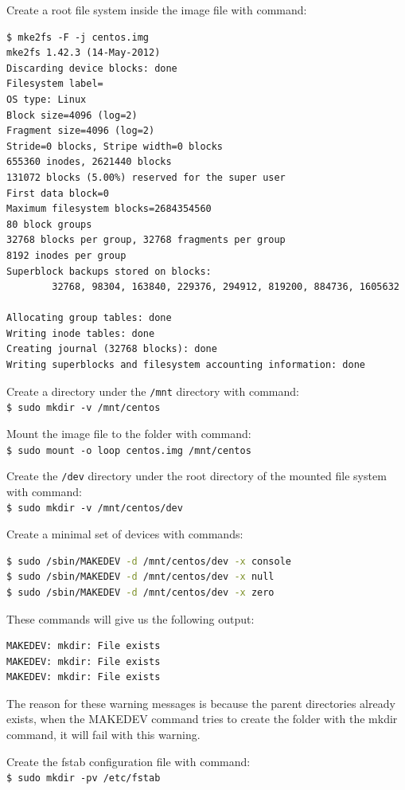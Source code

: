 Create a root file system inside the image file with command: 
\lstset{style=bashstyle}
\begin{lstlisting}
$ mke2fs -F -j centos.img
mke2fs 1.42.3 (14-May-2012)
Discarding device blocks: done
Filesystem label=
OS type: Linux
Block size=4096 (log=2)
Fragment size=4096 (log=2)
Stride=0 blocks, Stripe width=0 blocks
655360 inodes, 2621440 blocks
131072 blocks (5.00%) reserved for the super user
First data block=0
Maximum filesystem blocks=2684354560
80 block groups
32768 blocks per group, 32768 fragments per group
8192 inodes per group
Superblock backups stored on blocks:
        32768, 98304, 163840, 229376, 294912, 819200, 884736, 1605632

Allocating group tables: done
Writing inode tables: done
Creating journal (32768 blocks): done
Writing superblocks and filesystem accounting information: done
\end{lstlisting}

Create a directory under the \verb|/mnt| directory with command: \\
\verb|$ sudo mkdir -v /mnt/centos|

Mount the image file to the folder with command: \\
\verb|$ sudo mount -o loop centos.img /mnt/centos|

Create the \verb|/dev| directory under the root directory of the mounted file system with command: \\
\verb|$ sudo mkdir -v /mnt/centos/dev|

Create a minimal set of devices with commands:
\lstset{style=bashstyle}
\begin{lstlisting}[language=bash]
$ sudo /sbin/MAKEDEV -d /mnt/centos/dev -x console
$ sudo /sbin/MAKEDEV -d /mnt/centos/dev -x null
$ sudo /sbin/MAKEDEV -d /mnt/centos/dev -x zero
\end{lstlisting}
These commands will give us the following output:
\lstset{style=bashstyle}
\begin{lstlisting}
MAKEDEV: mkdir: File exists
MAKEDEV: mkdir: File exists
MAKEDEV: mkdir: File exists
\end{lstlisting}

The reason for these warning messages is because the parent directories already exists, when the MAKEDEV command tries to create the folder with the mkdir command, it will fail with this warning.

Create the fstab configuration file with command: \\
\verb|$ sudo mkdir -pv /etc/fstab|

